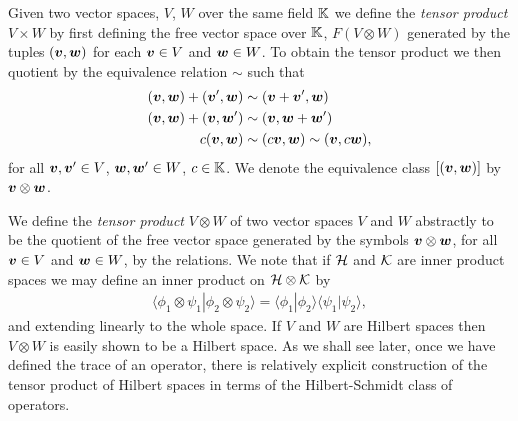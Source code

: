 Given two vector spaces, $V$, $W$ over the same field $\mathbb{K}$ we define the \emph{tensor product} $V\times W$ by first defining the free vector space over $\mathbb{K}$, $F(V\otimes W)$ generated by the tuples $(\bm{v}, \bm{w})$ for each $\bm{v}\in V$ and $\bm{w}\in W$. To obtain the tensor product we then quotient by the equivalence relation $\sim$ such that
\begin{align}
  (\bm{v},\bm{w}) + (\bm{v}^\prime, \bm{w}) &\sim (\bm{v}+ \bm{v}^\prime, \bm{w})\\
  (\bm{v},\bm{w}) + (\bm{v}, \bm{w}^\prime) &\sim (\bm{v}, \bm{w}+\bm{w}^\prime)\\
  c(\bm{v},\bm{w}) &\sim (c\bm{v},\bm{w})\sim (\bm{v},c\bm{w}),
\end{align}
for all $\bm{v}, \bm{v}^\prime\in V$, $\bm{w},\bm{w}^\prime \in W$, $c\in \mathbb{K}$. We denote the equivalence class $[(\bm{v},\bm{w})]$ by $\bm{v}\otimes \bm{w}$.

We define the \emph{tensor product} $V\otimes W$ of two vector spaces $V$ and $W$ abstractly to be the quotient of the free vector space generated by the symbols $\bm{v}\otimes \bm{w}$, for all $\bm{v}\in V$ and $\bm{w}\in W$, by the relations. We note that if $\mathcal{H}$ and $\mathcal{K}$ are inner product spaces we may define an inner product on $\mathcal{H}\otimes\mathcal{K}$ by 
\begin{align}
  \langle \phi_1\otimes \psi_1 | \phi_2\otimes \psi_2\rangle = \langle \phi_1 | \phi_2\rangle \langle \psi_1 | \psi_2\rangle,
\end{align}
and extending linearly to the whole space. If $V$ and $W$ are Hilbert spaces then $V\otimes W$ is easily shown to be a Hilbert space. As we shall see later, once we have defined the trace of an operator, there is relatively explicit construction of the tensor product of Hilbert spaces in terms of the Hilbert-Schmidt class of operators.

